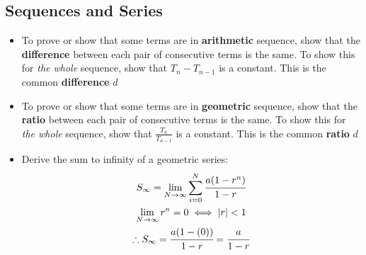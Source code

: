 \documentclass[10pt,a4paper]{article}
\begin{document}
\subsection{Sequences and Series}
    
    \begin{itemize}
        \item To prove or show that some terms are in \textbf{arithmetic} sequence, show that the \textbf{difference} between each pair of consecutive terms is the same. To show this for \textit{the whole} sequence, show that $T_n - T_{n-1}$ is a constant. This is the common \textbf{difference} $d$
        \item To prove or show that some terms are in \textbf{geometric} sequence, show that the \textbf{ratio} between each pair of consecutive terms is the same. To show this for \textit{the whole} sequence, show that $\frac{T_n}  {T_{n-1}}$ is a constant. This is the common \textbf{ratio} $d$
        \item \textcolor{gren2}{Derive} the sum to infinity of a geometric series: 
        \begin{gather}
            S_\infty = \lim_{N\to \infty} \sum_{i=0}^N\cfrac{a(1-r^n)}{1-r} \\
            \lim_{N\to \infty} r^n = 0 \iff |r| <1\\
            \therefore  S_\infty = \cfrac{a(1-(0))}{1-r} = \cfrac{a}{1-r}
        \end{gather}
        
    \end{itemize}    
\end{document}
